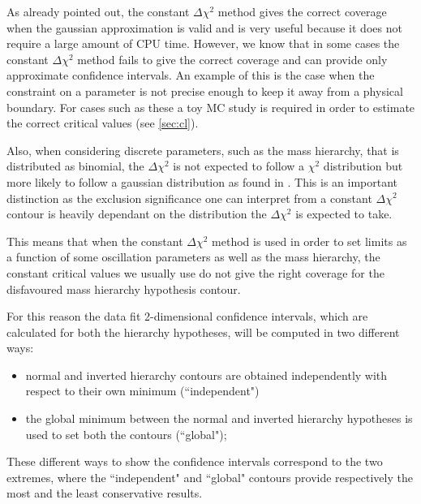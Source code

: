 As already pointed out, the constant $\Delta \chi^2$ method gives the correct coverage 
when the gaussian approximation is valid and is very useful because it does not require a large amount of CPU time.
However, we know that in some cases the constant $\Delta \chi^2$ method fails to give the correct coverage
and can provide only approximate confidence intervals.
An example of this is the case when the constraint on a parameter is not precise enough to keep it away from a physical boundary. 
For cases such as these a toy MC study is required in order to estimate the correct critical values
(see \cref{sec:cl}).

Also, when considering discrete parameters, such as the mass hierarchy, that is distributed as binomial,
the $\Delta \chi^2$ is not expected to follow a 
$\chi^2$ distribution but more likely to follow a gaussian distribution as found in \cite{cl_masshierarchy}. This is an important 
distinction as the exclusion significance one can interpret from a constant $\Delta \chi^2$ contour is heavily dependant on the 
distribution the $\Delta \chi^2$ is expected to take. 


This means that when the constant $\Delta \chi^2$ method is used in order 
to set limits as a function of some oscillation parameters as well as the mass hierarchy,
the constant critical values we usually use
do not give the right coverage for the disfavoured mass hierarchy hypothesis contour.

For this reason the data fit 2-dimensional confidence intervals, 
which are calculated for both the hierarchy hypotheses, 
will be computed in two different ways:
\begin{itemize}
\item normal and inverted hierarchy contours are obtained independently
	with respect to their own minimum (``independent")
\item the global minimum between the normal and inverted hierarchy hypotheses
	is used to set both the contours (``global");
\end{itemize}
These different ways to show the confidence intervals correspond
to the two extremes, where the ``independent" and ``global" contours 
provide respectively the most and the least conservative results.

